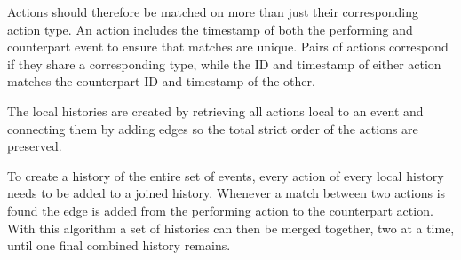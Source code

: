 	Actions should therefore be matched on more than just their corresponding action type. An action includes the timestamp of both the performing and counterpart event to ensure that matches are unique.
    Pairs of actions correspond if they share a corresponding type, while the ID and timestamp of either action matches the counterpart ID and timestamp of the other.

	The local histories are created by retrieving all actions local to an event and connecting them by adding edges so the total strict order of the actions are preserved.

	To create a history of the entire set of events, every action of every local history needs to be added to a joined history.  Whenever a match between two actions is found the edge is added from the performing action to the counterpart action. With this algorithm a set of histories can then be merged together, two at a time, until one final combined history remains.
    
